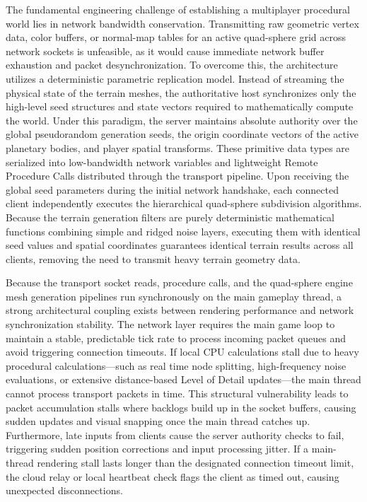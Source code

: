 \documentclass[12pt]{report}
\begin{document}
The fundamental engineering challenge of establishing a multiplayer procedural world lies in network bandwidth conservation. Transmitting raw geometric vertex data, color buffers, or normal-map tables for an active quad-sphere grid across network sockets is unfeasible, as it would cause immediate network buffer exhaustion and packet desynchronization. To overcome this, the architecture utilizes a deterministic parametric replication model. Instead of streaming the physical state of the terrain meshes, the authoritative host synchronizes only the high-level seed structures and state vectors required to mathematically compute the world. Under this paradigm, the server maintains absolute authority over the global pseudorandom generation seeds, the origin coordinate vectors of the active planetary bodies, and player spatial transforms. These primitive data types are serialized into low-bandwidth network variables and lightweight Remote Procedure Calls distributed through the transport pipeline. Upon receiving the global seed parameters during the initial network handshake, each connected client independently executes the hierarchical quad-sphere subdivision algorithms. Because the terrain generation filters are purely deterministic mathematical functions combining simple and ridged noise layers, executing them with identical seed values and spatial coordinates guarantees identical terrain results across all clients, removing the need to transmit heavy terrain geometry data.

Because the transport socket reads, procedure calls, and the quad-sphere engine mesh generation pipelines run synchronously on the main gameplay thread, a strong architectural coupling exists between rendering performance and network synchronization stability. The network layer requires the main game loop to maintain a stable, predictable tick rate to process incoming packet queues and avoid triggering connection timeouts. If local CPU calculations stall due to heavy procedural calculations—such as real time node splitting, high-frequency noise evaluations, or extensive distance-based Level of Detail updates—the main thread cannot process transport packets in time. This structural vulnerability leads to packet accumulation stalls where backlogs build up in the socket buffers, causing sudden updates and visual snapping once the main thread catches up. Furthermore, late inputs from clients cause the server authority checks to fail, triggering sudden position corrections and input processing jitter. If a main-thread rendering stall lasts longer than the designated connection timeout limit, the cloud relay or local heartbeat check flags the client as timed out, causing unexpected disconnections.
\end{document}
